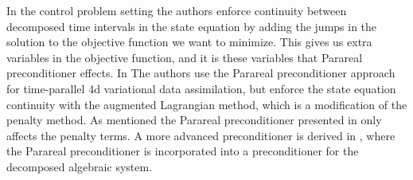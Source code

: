 In the control problem setting the authors enforce continuity between decomposed time intervals in the state equation by adding the jumps in the solution to the objective function we want to minimize. This gives us extra variables in the objective function, and it is these variables that Parareal preconditioner effects. In \cite{rao2016time} The authors use the Parareal preconditioner approach for time-parallel 4d variational data assimilation, but enforce the state equation continuity with the augmented Lagrangian method, which is a modification of the penalty method\cite{nocedal2006numerical}. As mentioned the Parareal preconditioner presented in \cite{maday2002parareal} only affects the penalty terms. A more advanced preconditioner is derived in \cite{ulbrich2015preconditioners}, where the Parareal preconditioner is incorporated into a preconditioner for the decomposed algebraic system.
